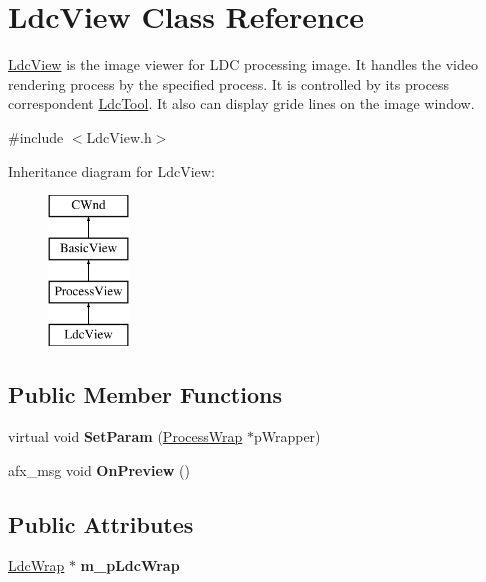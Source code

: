 \hypertarget{class_ldc_view}{}\section{Ldc\+View Class Reference}
\label{class_ldc_view}


\mbox{\hyperlink{class_ldc_view}{Ldc\+View}} is the image viewer for L\+DC processing image. It handles the video rendering process by the specified process. It is controlled by its process correspondent \mbox{\hyperlink{class_ldc_tool}{Ldc\+Tool}}. It also can display gride lines on the image window.  




{\ttfamily \#include $<$Ldc\+View.\+h$>$}

Inheritance diagram for Ldc\+View\+:\begin{figure}[H]
\begin{center}
\leavevmode
\includegraphics[height=4.000000cm]{class_ldc_view}
\end{center}
\end{figure}
\subsection*{Public Member Functions}
\begin{DoxyCompactItemize}
\item 
\mbox{\label{class_ldc_view_a20c9c453f1e600fb26768d749276a85f}} 
virtual void {\bfseries Set\+Param} (\mbox{\hyperlink{class_process_wrap}{Process\+Wrap}} $\ast$p\+Wrapper)
\item 
\mbox{\label{class_ldc_view_a5028dabeae808988f124ef5e79418c00}} 
afx\+\_\+msg void {\bfseries On\+Preview} ()
\end{DoxyCompactItemize}
\subsection*{Public Attributes}
\begin{DoxyCompactItemize}
\item 
\mbox{\label{class_ldc_view_aa6ebb786ca8301d34102439db0eca5e8}} 
\mbox{\hyperlink{class_ldc_wrap}{Ldc\+Wrap}} $\ast$ {\bfseries m\+\_\+p\+Ldc\+Wrap}
\end{DoxyCompactItemize}
